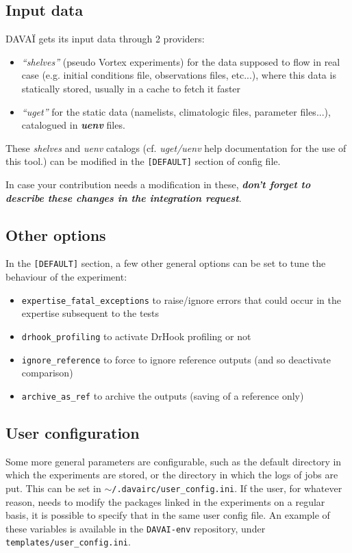 \documentclass[a4paper,10pt,twoside]{article}
\begin{document}
\subsection{Input data}
DAVAÏ gets its input data through 2 providers:
\begin{itemize}
 \item \textit{``shelves''} (pseudo Vortex experiments) for the data supposed to flow in real case (e.g. initial conditions file, observations files, etc...), where this data is statically stored, usually in a cache to fetch it faster
 \item \textit{``uget''} for the static data (namelists, climatologic files, parameter files...), catalogued in \textit{\textbf{uenv}} files.
\end{itemize}

These \textit{shelves} and \textit{uenv} catalogs (cf. \textit{uget/uenv} help documentation for the use of this tool.) can be modified in the \texttt{[DEFAULT]} section of config file.

In case your contribution needs a modification in these, \textbf{\textit{don't forget to describe these changes in the integration request}}.



\subsection{Other options}
In the \texttt{[DEFAULT]} section, a few other general options can be set to tune the behaviour of the experiment:
\begin{itemize}
 \item \texttt{expertise\_fatal\_exceptions} to raise/ignore errors that could occur in the expertise subsequent to the tests
 \item \texttt{drhook\_profiling} to activate DrHook profiling or not
 \item \texttt{ignore\_reference} to force to ignore reference outputs (and so deactivate comparison)
 \item \texttt{archive\_as\_ref} to archive the outputs (saving of a reference only)
\end{itemize}


\subsection{User configuration}
Some more general parameters are configurable, such as the default directory in which the experiments are stored, or the directory in which the logs of jobs are put. This can be set in \texttt{$\sim$/.davairc/user\_config.ini}.
If the user, for whatever reason, needs to modify the packages linked in the experiments on a regular basis, it is possible to specify that in the same user config file.
An example of these variables is available in the \texttt{DAVAI-env} repository, under \texttt{templates/user\_config.ini}.
\end{document}
